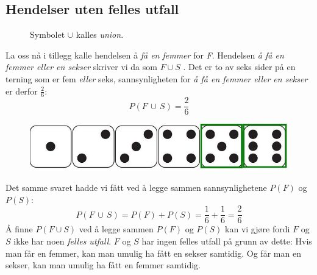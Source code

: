 \subsection{Hendelser uten felles utfall}
\begin{figure}
	\begin{shaded*}
		Symbolet $ \cup $ kalles \textit{union}.
	\end{shaded*}
\end{figure}
La oss nå i tillegg kalle hendelsen å \textit{få en femmer} for \textit{F}. Hendelsen \textit{å få en femmer \textsl{eller} en sekser} skriver vi da som $ F\cup S $ . Det er to av seks sider på en terning som er fem \textsl{eller} seks, sannsynligheten for \textit{å få en femmer \textsl{eller} en sekser} er derfor $ \frac{2}{6} $:
$$P(F\,\cup\,S)=\frac{2}{6}$$ 
\begin{figure}[H]
	\centering
	\includegraphics[scale=0.3]{tern2}
\end{figure}

Det samme svaret hadde vi fått ved å legge sammen sannsynlighetene $P(F)$ og $P(S)$:
\[ P(F\,\cup\,S)=P(F)+P(S)=\frac{1}{6}+\frac{1}{6}=\frac{2}{6} \]
Å finne $ P(F\cup S) $ ved å legge sammen $ P(F) $ og $ P(S) $ kan vi gjøre fordi $ F $ og $ S $ ikke har noen \textit{felles utfall}. $ F $ og $ S $ har ingen felles utfall på grunn av dette: Hvis man får en femmer, kan man umulig ha fått en sekser samtidig. Og får man en sekser, kan man umulig ha fått en femmer samtidig.
